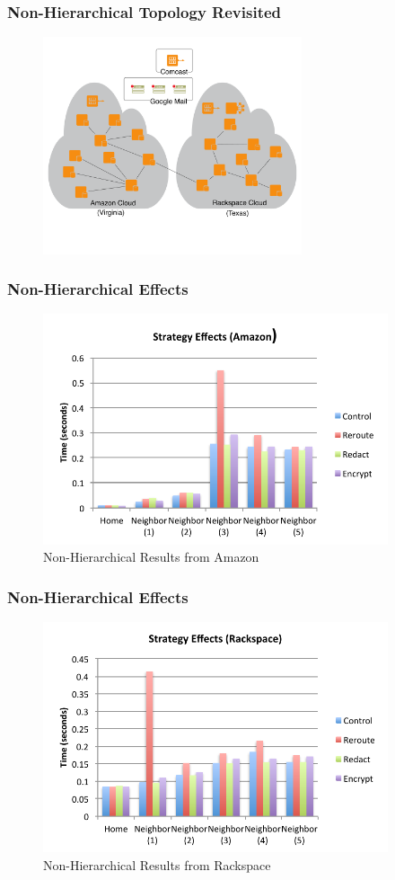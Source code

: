 \documentclass[t,handout]{beamer}
\begin{document}
\begin{frame}
\frametitle{Non-Hierarchical Topology Revisited}
\begin{figure}[!t]
\centering
\includegraphics[width=3in]{non-hierarchical-clouds}
\end{figure}
\end{frame}

\begin{frame}
\frametitle{Non-Hierarchical Effects}
\begin{figure}[!t]
\centering
\includegraphics[width=4in]{nh_strategy_effects_az}
\caption{Non-Hierarchical Results from Amazon}
\end{figure}
\end{frame}

\begin{frame}
\frametitle{Non-Hierarchical Effects}
\begin{figure}[!t]
\centering
\includegraphics[width=4in]{nh_strategy_effects_rs}
\caption{Non-Hierarchical  Results from Rackspace}
\end{figure}
\end{frame}
\end{document}
